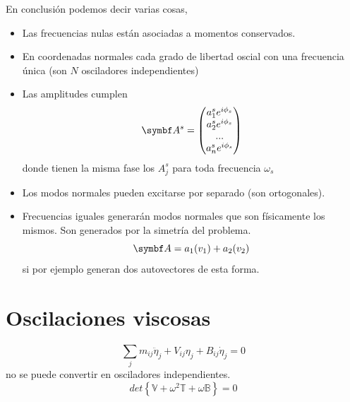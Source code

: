 \documentclass[10pt,oneside]{CBFT_book}
\begin{document}
En conclusión podemos decir varias cosas,
\begin{itemize}
 \item Las frecuencias nulas están asociadas a momentos conservados.
 \item En coordenadas normales cada grado de libertad oscial con una frecuencia única (son $N$
	osciladores independientes)
 \item Las amplitudes cumplen
 \[ \vb{A}^s =
 \begin{pmatrix}
  a_1^s e^{i \phi_s} \\
  a_2^s e^{i \phi_s} \\
  ... \\
  a_n^s e^{i \phi_s}
 \end{pmatrix}
 \]
 donde tienen la misma fase los $A_j^s$ para toda frecuencia $\omega_s$
 \item Los modos normales pueden excitarse por separado (son ortogonales).
 \item Frecuencias iguales generarán modos normales que son físicamente los
 mismos. Son generados por la simetría del problema.
 \[
	\vb{A} = a_1(v_1) + a_2(v_2)
 \]
 si por ejemplo generan dos autovectores de esta forma.
\end{itemize}


\section{Oscilaciones viscosas}

\[
	\sum_j m_{ij} \ddot{\eta}_j + V_{ij}\eta_j + B_{ij}\dot{\eta}_j = 0
\]
no se puede convertir en osciladores independientes.
\[
	det\left\{ \mathbb{V} + \omega^2 \mathbb{T} + \omega \mathbb{B}\right\} = 0
\]






\end{document}
